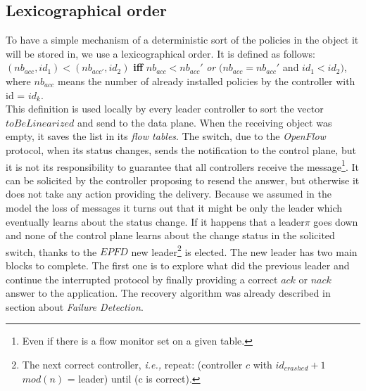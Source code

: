 \documentclass{article}
\theoremstyle{remark}
\begin{document}
\subsection{Lexicographical order}
To have a simple mechanism of a deterministic sort of the policies in the object it will be stored in, we use a lexicographical order.
It is defined as follows:\\
$(nb_{acc}, id_1 )<(nb_{acc'}, id_2)$  \textbf{iff}  $nb_{acc} < nb_{acc}'  $ \emph{or} $(nb_{acc} = nb_{acc}'$ and $id_1<id_2)$, where $nb_{acc}$ means the number of already installed policies by the controller with id = $id_k$.\\
This definition is used locally by every leader controller to sort the vector $toBeLinearized$ and send to the data plane. When the receiving object was empty, it saves the list in its \emph{flow tables}. The switch, due to the \emph{OpenFlow} protocol, when its status changes, sends the notification to the control plane, but it is not its responsibility to guarantee that all controllers receive the message\footnote{Even if there is a flow monitor set on a given table.}. It can be solicited by the controller proposing to resend the answer, but otherwise it does not take any action providing the delivery. Because we assumed in the model the loss of messages it turns out that it might be only the leader which eventually learns about the status change.
If it happens that a leader$\pi$ goes down and none of the control plane learns about the change status in the solicited switch, thanks to the $EPFD$ new leader\footnote{The next correct controller, \emph{i.e.,} repeat: (controller $c$ with $id_{crashed}+1$ $mod(n)$ = leader) until (c is correct). } is elected.
The new leader has two main blocks to complete. The first one is to explore what did the previous leader and continue the interrupted protocol by finally providing a correct $ack$ or $nack$ answer to the application. The recovery algorithm was already described in section about \emph{Failure Detection}. \\
 
\end{document}
